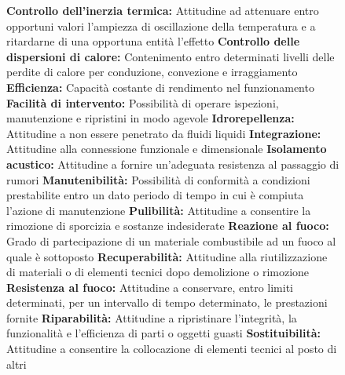 \begin{figure}[p]
{\textbf{Controllo dell'inerzia termica:} Attitudine ad attenuare entro opportuni valori l'ampiezza di oscillazione della temperatura e a ritardarne di una opportuna entità l'effetto
\textbf{Controllo delle dispersioni di calore:} Contenimento entro determinati livelli delle perdite di calore per conduzione, convezione e irraggiamento
\textbf{Efficienza:} Capacità costante di rendimento nel funzionamento
\textbf{Facilità di intervento:} Possibilità di operare ispezioni, manutenzione e ripristini in modo agevole
\textbf{Idrorepellenza:} Attitudine a non essere penetrato da fluidi liquidi
\textbf{Integrazione:} Attitudine alla connessione funzionale e dimensionale
\textbf{Isolamento acustico:} Attitudine a fornire un'adeguata resistenza al passaggio di rumori
\textbf{Manutenibilità:} Possibilità di conformità a condizioni prestabilite entro un dato periodo di tempo in cui è compiuta l'azione di manutenzione
\textbf{Pulibilità:} Attitudine a consentire la rimozione di sporcizia e sostanze indesiderate
\textbf{Reazione al fuoco:} Grado di partecipazione di un materiale combustibile ad un fuoco al quale è sottoposto
\textbf{Recuperabilità:} Attitudine alla riutilizzazione di materiali o di elementi tecnici dopo demolizione o rimozione
\textbf{Resistenza al fuoco:} Attitudine a conservare, entro limiti determinati, per un intervallo di tempo determinato, le prestazioni fornite
\textbf{Riparabilità:} Attitudine a ripristinare l'integrità, la funzionalità e l'efficienza di parti o oggetti guasti 
\textbf{Sostituibilità:} Attitudine a consentire la collocazione di elementi tecnici al posto di altri}
\label{fig:AnalisiValore}
\end{figure}